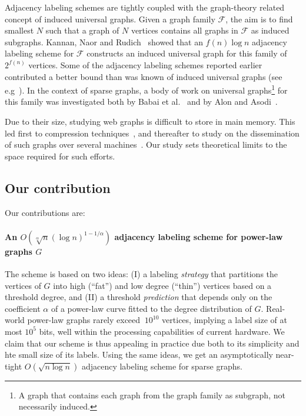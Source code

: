 Adjacency labeling schemes are tightly coupled with  the graph-theory related concept of induced universal graphs.
Given a  graph family  $\mathcal{F}$, the aim  is to find smallest $N$ such that a graph of  $N$ vertices contains all graphs in $\mathcal{F}$ as induced subgraphs. 
Kannan, Naor and Rudich~\cite{Kannan92} showed that an $f(n) \log n$ adjacency labeling scheme for $\mathcal{F}$  constructs an induced universal graph for this family of  $2^{f(n)}$ vertices. Some  of the adjacency labeling schemes reported earlier  contributed a better bound than was known of  induced universal graphs (see e.g~\cite{BCLR,Alstrup02}).
In the context of  sparse graphs,  a body of work on universal graphs\footnote{A graph that  contains each graph from the graph family as subgraph, not necessarily induced.} for this family was  investigated both by  Babai et al.~\cite{babai1982graphs} and  by Alon and Asodi~\cite{Alon2002universal}. 

Due to their size, studying web graphs is difficult to store in main memory. This led first to compression techniques~\cite{boldi2004webgraph,boldi2011layered}, and thereafter to study on the dissemination  of such graphs over several machines~\cite{gonzalez2012powergraph}. Our study sets theoretical limits to the space required for such  efforts.

\subsection{Our contribution}

Our contributions are:

\paragraph{An  $O(\sqrt[\alpha] n (\log n)^{1 - 1/\alpha})$ adjacency labeling scheme for power-law graphs $G$}
The scheme is based on two ideas:
(I) a labeling \emph{strategy} that  partitions the vertices of $G$ into high (``fat'') and low degree (``thin'') vertices based on a threshold degree, and (II) a threshold \emph{prediction} that depends only on the coefficient $\alpha$ of a power-law curve fitted to the degree distribution of $G$. 
Real-world power-law graphs rarely exceed  $~10^{10}$ vertices, implying a label size of at most  ${10^{5}}$ bits, well within the processing capabilities of current hardware. 
We claim that our  scheme is thus appealing in practice   due both to  its simplicity and hte small size of its labels.
Using the same ideas, we get an  asymptotically near-tight  $O(\sqrt{n \log n})$ adjacency labeling scheme for sparse graphs.

